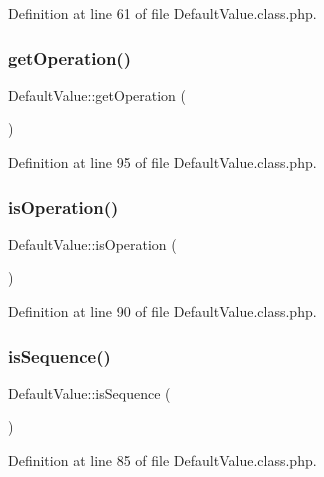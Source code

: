 Definition at line 61 of file Default\+Value.\+class.\+php.

\hypertarget{classDefaultValue_a1e607abe2e29a00fa3ab0cecba406776}{}\label{classDefaultValue_a1e607abe2e29a00fa3ab0cecba406776} 
\subsubsection{\texorpdfstring{get\+Operation()}{getOperation()}}
{\footnotesize\ttfamily Default\+Value\+::get\+Operation (\begin{DoxyParamCaption}{ }\end{DoxyParamCaption})}



Definition at line 95 of file Default\+Value.\+class.\+php.

\hypertarget{classDefaultValue_af7a051370a3b8bb17d9f9cf64a03be74}{}\label{classDefaultValue_af7a051370a3b8bb17d9f9cf64a03be74} 
\subsubsection{\texorpdfstring{is\+Operation()}{isOperation()}}
{\footnotesize\ttfamily Default\+Value\+::is\+Operation (\begin{DoxyParamCaption}{ }\end{DoxyParamCaption})}



Definition at line 90 of file Default\+Value.\+class.\+php.

\hypertarget{classDefaultValue_a5186ba40cadb8a1740edd64665f4c126}{}\label{classDefaultValue_a5186ba40cadb8a1740edd64665f4c126} 
\subsubsection{\texorpdfstring{is\+Sequence()}{isSequence()}}
{\footnotesize\ttfamily Default\+Value\+::is\+Sequence (\begin{DoxyParamCaption}{ }\end{DoxyParamCaption})}



Definition at line 85 of file Default\+Value.\+class.\+php.

